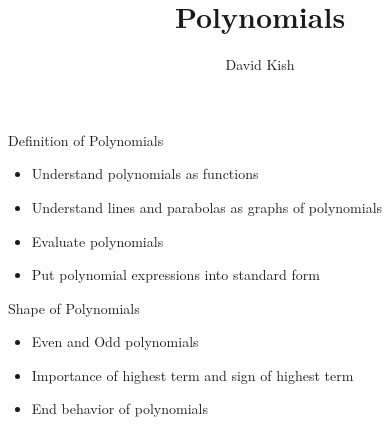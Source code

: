\documentclass{ximera}
\author{David Kish}
\title{Polynomials}
\begin{document}
\begin{abstract}
\end{abstract}
\maketitle


\begin{objectives}



\item Definition of Polynomials
\begin{itemize}
	\item Understand polynomials as functions
	\item Understand lines and parabolas as graphs of polynomials
	\item Evaluate polynomials
	\item Put polynomial expressions into standard form
\end{itemize}

\item Shape of Polynomials
\begin{itemize}
	\item Even and Odd polynomials
	\item Importance of highest term and sign of highest term  
	\item End behavior of polynomials 
\end{itemize}

\end{objectives}
\end{document}
